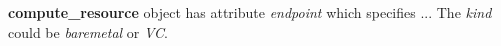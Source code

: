 \textbf{compute\_resource} object has attribute \textit{endpoint} which
specifies ... The \textit{kind} could be \textit{baremetal} or \textit{VC}.
